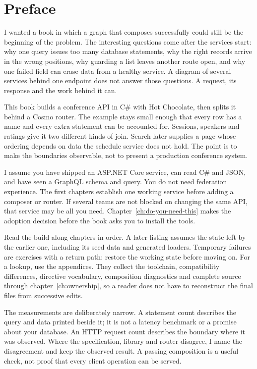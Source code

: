\chapter{Preface}
\label{ch:preface}

I wanted a book in which a graph that composes successfully could still be
the beginning of the problem. The interesting questions come after the
services start: why one query issues too many database statements, why the
right records arrive in the wrong positions, why guarding a list leaves
another route open, and why one failed field can erase data from a healthy
service. A diagram of several services behind one endpoint does not answer
those questions. A request, its response and the work behind it can.

This book builds a conference API in C\# with Hot Chocolate, then splits it
behind a Cosmo router. The example stays small enough that every row has a
name and every extra statement can be accounted for. Sessions, speakers and
ratings give it two different kinds of join. Search later supplies a page
whose ordering depends on data the schedule service does not hold. The
point is to make the boundaries observable, not to present a production
conference system.

I assume you have shipped an ASP.NET Core service, can read C\# and JSON,
and have seen a GraphQL schema and query. You do not need federation
experience. The first chapters establish one working service before adding
a composer or router. If several teams are not blocked on changing the same
API, that service may be all you need. Chapter~\ref{ch:do-you-need-this}
makes the adoption decision before the book asks you to install the tools.

Read the build-along chapters in order. A later listing assumes the state
left by the earlier one, including its seed data and generated loaders.
Temporary failures are exercises with a return path: restore the working
state before moving on. For a lookup, use the appendices. They collect the
toolchain, compatibility differences, directive vocabulary, composition
diagnostics and complete source through chapter~\ref{ch:ownership}, so a
reader does not have to reconstruct the final files from successive edits.

The measurements are deliberately narrow. A statement count describes the
query and data printed beside it; it is not a latency benchmark or a promise
about your database. An HTTP request count describes the boundary where it
was observed. Where the specification, library and router disagree, I name
the disagreement and keep the observed result. A passing composition is a
useful check, not proof that every client operation can be served.

